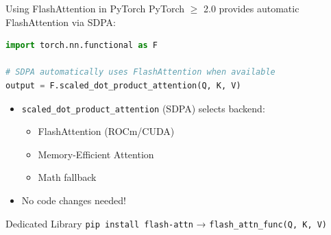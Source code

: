 \documentclass[aspectratio=169,10pt]{beamer}
\begin{document}
\begin{frame}[fragile]{Using FlashAttention in PyTorch}
    PyTorch $\geq$ 2.0 provides automatic FlashAttention via SDPA:

    \vspace{0.3cm}
    \begin{lstlisting}[language=Python]
import torch.nn.functional as F

# SDPA automatically uses FlashAttention when available
output = F.scaled_dot_product_attention(Q, K, V)
    \end{lstlisting}

    \vspace{0.5cm}
    \begin{itemize}
        \item \texttt{scaled\_dot\_product\_attention} (SDPA) selects backend:
        \begin{itemize}
            \item FlashAttention (ROCm/CUDA)
            \item Memory-Efficient Attention
            \item Math fallback
        \end{itemize}
        \item No code changes needed!
    \end{itemize}

    \vspace{0.3cm}
    \begin{block}{Dedicated Library}
        \texttt{pip install flash-attn} → \texttt{flash\_attn\_func(Q, K, V)}
    \end{block}
\end{frame}
\end{document}
